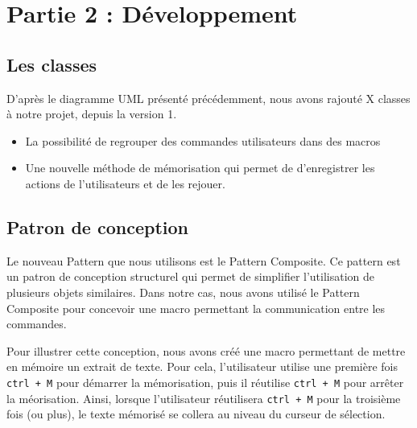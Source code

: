 \documentclass[a4paper, 12pt]{report}
\begin{document}
    \newpage
	
	\chapter*{Partie 2 : Développement}

		\section*{Les classes}

			D'après le diagramme UML présenté précédemment, nous avons rajouté X classes à notre projet, depuis la version 1.

		\begin{itemize}
			\item La possibilité de regrouper des commandes utilisateurs dans des macros

			\item Une nouvelle méthode de mémorisation qui permet de d'enregistrer les actions de l'utilisateurs et de les rejouer. 

		\end{itemize}

		\section*{Patron de conception}

		Le nouveau Pattern que nous utilisons est le Pattern Composite. Ce pattern est un patron de conception structurel qui permet de simplifier l'utilisation de plusieurs objets similaires. Dans notre cas, nous avons utilisé le Pattern Composite pour concevoir une macro permettant la communication entre les commandes. 

		\vspace{0.5cm}

		Pour illustrer cette conception, nous avons créé une macro permettant de mettre en mémoire un extrait de texte. Pour cela, l'utilisateur utilise une première fois \texttt{ctrl + M} pour démarrer la mémorisation, puis il réutilise \texttt{ctrl + M} pour arrêter la méorisation. Ainsi, lorsque l'utilisateur réutilisera \texttt{ctrl + M} pour la troisième fois (ou plus), le texte mémorisé se collera au niveau du curseur de sélection. 
\end{document}
